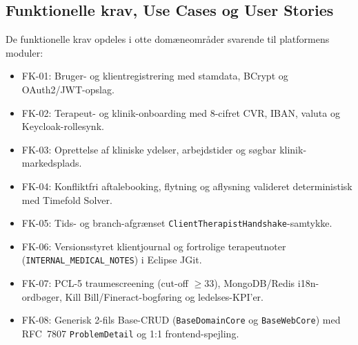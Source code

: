 \documentclass[11pt,a4paper]{article}
\begin{document}
\subsection{Funktionelle krav, Use Cases og User Stories}
De funktionelle krav opdeles i otte domæneområder svarende til platformens moduler:
\begin{itemize}[noitemsep]
    \item FK-01: Bruger- og klientregistrering med stamdata, BCrypt og OAuth2/JWT-opslag.
    \item FK-02: Terapeut- og klinik-onboarding med 8-cifret CVR, IBAN, valuta og Keycloak-rollesynk.
    \item FK-03: Oprettelse af kliniske ydelser, arbejdstider og søgbar klinik-markedsplads.
    \item FK-04: Konfliktfri aftalebooking, flytning og aflysning valideret deterministisk med Timefold Solver.
    \item FK-05: Tids- og branch-afgrænset \texttt{ClientTherapistHandshake}-samtykke.
    \item FK-06: Versionsstyret klientjournal og fortrolige terapeutnoter (\texttt{INTERNAL\_MEDICAL\_NOTES}) i Eclipse JGit.
    \item FK-07: PCL-5 traumescreening (cut-off $\ge 33$), MongoDB/Redis i18n-ordbøger, Kill Bill/Fineract-bogføring og ledelses-KPI'er.
    \item FK-08: Generisk 2-fils Base-CRUD (\texttt{BaseDomainCore} og \texttt{BaseWebCore}) med RFC~7807 \texttt{ProblemDetail} og 1:1 frontend-spejling.
\end{itemize}
\end{document}
